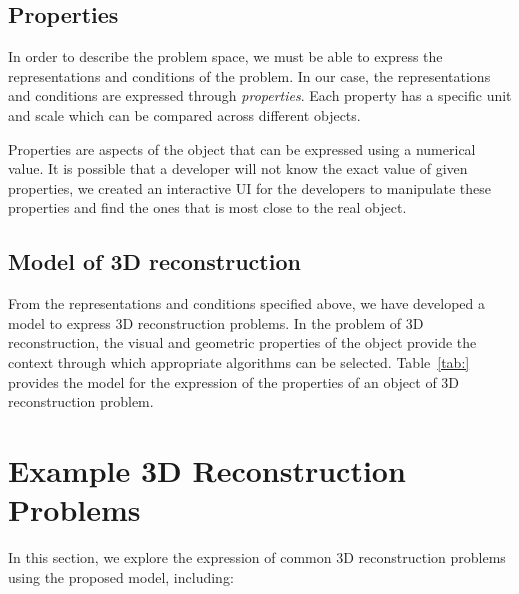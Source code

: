 \subsection{Properties}
In order to describe the problem space, we must be able to express the representations and conditions of the problem. In our case, the representations and conditions are expressed through \textit{properties}. Each property has a specific unit and scale which can be compared across different objects.

Properties are aspects of the object that can be expressed using a numerical value. It is possible that a developer will not know the exact value of given properties, we created an interactive UI for the developers to manipulate these properties and find the ones that is most close to the real object.

\subsection{Model of 3D reconstruction}
From the representations and conditions specified above, we have developed a model to express 3D reconstruction problems. In the problem of 3D reconstruction, the visual and geometric properties of the object provide the context through which appropriate algorithms can be selected. Table~\ref{tab:} provides the model for the expression of the properties of an object of 3D reconstruction problem.

\section{Example 3D Reconstruction Problems}
In this section, we explore the expression of common 3D reconstruction problems using the proposed model, including: 




